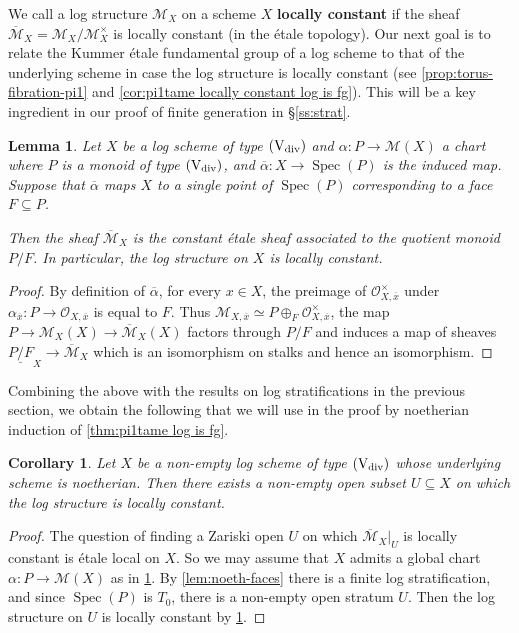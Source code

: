 \documentclass[a4paper,twoside,11pt,reqno]{amsart}
\newcommand{\cM}{{\mathcal M}}
\newcommand{\cO}{{\mathcal O}}
\DeclareMathOperator{\Spec}{Spec}
\newcommand{\ov}[1]{\overline{#1}}
\newcommand{\typeVd}{(\mathrm{V}_{\rm div})}
\newtheorem{lem}[thm]{Lemma}
\newtheorem{cor}[thm]{Corollary}
\theoremstyle{definition}
\numberwithin{equation}{subsection}
\begin{document}
We call a log structure $\cM_X$ on a scheme $X$ {\bf locally constant} if the sheaf $\overline{\cM}_X = \cM_X/\cM_X^\times$ is locally constant (in the \'etale topology). Our next goal is to relate the Kummer \'etale fundamental group of a log scheme to that of the underlying scheme in case the log structure is locally constant (see \cref{prop:torus-fibration-pi1} and \cref{cor:pi1tame locally constant log is fg}). This will be a key ingredient in our proof of finite generation in \S\ref{ss:strat}.

\begin{lem} \label{lem:ovalpha--const}
    Let $X$ be a log scheme of type $\typeVd$ and $\alpha\colon P\to \cM(X)$ a chart where $P$ is a monoid of type $\typeVd$, and $\ov\alpha\colon X\to \Spec(P)$ is the induced map. Suppose that $\ov{\alpha}$ maps $X$ to a single point of $\Spec(P)$ corresponding to a face $F\subseteq P$. 
    
    Then the sheaf $\ov{\cM}_X$ is the constant \'etale sheaf associated to the quotient monoid $P/F$. In particular, the log structure on $X$ is locally constant. 
\end{lem}

\begin{proof}
By definition of $\ov\alpha$, for every $x\in X$, the preimage of $\cO_{X,\ov{x}}^\times$ under $\alpha_{\ov x}\colon P\to \cO_{X,\ov{x}}$ is equal to $F$. Thus $\cM_{X,\ov{x}} \simeq P\oplus_F \cO_{X,\ov{x}}^\times$, the map $P\to \cM_X(X)\to \ov{\cM}_X(X)$ factors through $P/F$ and induces a map of sheaves $\underline{P/F}_X\to \ov{\cM}_X$ which is an isomorphism on stalks and hence an isomorphism. 
\end{proof}

Combining the above with the results on log stratifications in the previous section, we obtain the following that we will use in the proof by noetherian induction of \cref{thm:pi1tame log is fg}.

\begin{cor} \label{cor:generically-log-constant}
    Let $X$ be a non-empty log scheme of type $\typeVd$ whose underlying scheme is noetherian. Then there exists a non-empty open subset $U\subseteq X$ on which the log structure is locally constant. 
\end{cor}
\begin{proof}
    The question of finding a Zariski open $U$ on which $\overline{\cM}_X|_U$ is locally constant is \'etale local on $X$. So we may assume that $X$ admits a global chart $\alpha\colon P\to \cM(X)$ as in \cref{lem:ovalpha--const}.
    By \cref{lem:noeth-faces} there is a finite log stratification, and since $\Spec(P)$ is $T_0$, there is a non-empty open stratum $U$. 
    Then the log structure on $U$ is locally constant by \cref{lem:ovalpha--const}.
\end{proof}
\end{document}
